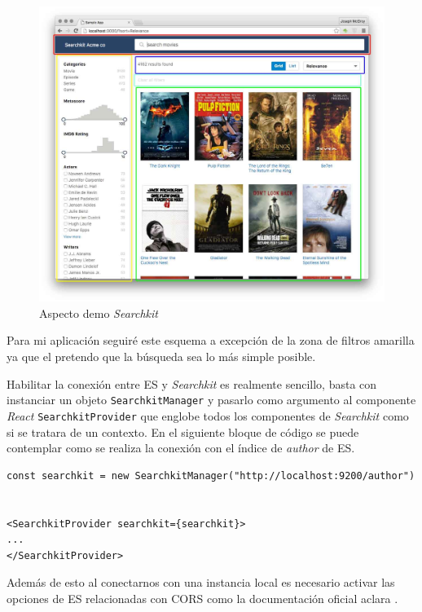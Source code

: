 \begin{figure}[h]
	
	\centering
	\includegraphics[width=\linewidth]{imagenes/AspectDemoSearchKit}
	\caption{Aspecto demo \textit{Searchkit}}
\end{figure}

Para mi aplicación seguiré este esquema a excepción de la zona de filtros amarilla ya que el pretendo que la búsqueda sea lo más simple posible.

Habilitar la conexión entre \acrshort{ES} y \textit{Searchkit} es realmente sencillo, basta con instanciar un objeto \texttt{SearchkitManager} y pasarlo como argumento al componente \textit{React} \texttt{SearchkitProvider} que englobe todos los componentes de \textit{Searchkit} como si se tratara de un contexto. En el siguiente bloque de código se puede contemplar como se realiza la conexión con el índice de \textit{author} de \acrshort{ES}.

\newpage

\begin{lstlisting}[style=htmlcssjs, caption=Conexión de \textit{Searchkit} a una instancia \acrshort{ES} local]
const searchkit = new SearchkitManager("http://localhost:9200/author")


<SearchkitProvider searchkit={searchkit}>
...
</SearchkitProvider>
\end{lstlisting}

Además de esto al conectarnos con una instancia local es necesario activar las opciones de \acrshort{ES} relacionadas con CORS como la documentación oficial aclara \cite{searchKit_cors}.

